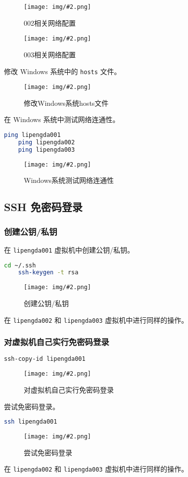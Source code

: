 \documentclass{article}
\newcommand{\img}[3][0.9]{%
    \begin{figure}[H]
        \centering
        \texttt{[image: img/\#2.png]}
        \caption{#3}
    \end{figure}
}
\begin{document}
\img{4.2.1}{002相关网络配置}

\img{4.2.2}{003相关网络配置}

修改 Windows 系统中的 \texttt{hosts} 文件。

\img{4.2.3}{修改Windows系统hosts文件}

在 Windows 系统中测试网络连通性。

\begin{lstlisting}[language=bash]
    ping lipengda001
    ping lipengda002
    ping lipengda003
\end{lstlisting}

\img{4.2.4}{Windows系统测试网络连通性}


\subsection{SSH 免密码登录}

\subsubsection{创建公钥/私钥}

在 \texttt{lipengda001} 虚拟机中创建公钥/私钥。

\begin{lstlisting}[language=bash]
    cd ~/.ssh
    ssh-keygen -t rsa
\end{lstlisting}

\img[0.8]{5.1.1}{创建公钥/私钥}

在 \texttt{lipengda002} 和 \texttt{lipengda003} 虚拟机中进行同样的操作。

\subsubsection{对虚拟机自己实行免密码登录}

\begin{lstlisting}[language=bash]
    ssh-copy-id lipengda001
\end{lstlisting}

\img[0.8]{5.2.1}{对虚拟机自己实行免密码登录}

尝试免密码登录。

\begin{lstlisting}[language=bash]
    ssh lipengda001
\end{lstlisting}

\img{5.2.2}{尝试免密码登录}

在 \texttt{lipengda002} 和 \texttt{lipengda003} 虚拟机中进行同样的操作。
\end{document}
